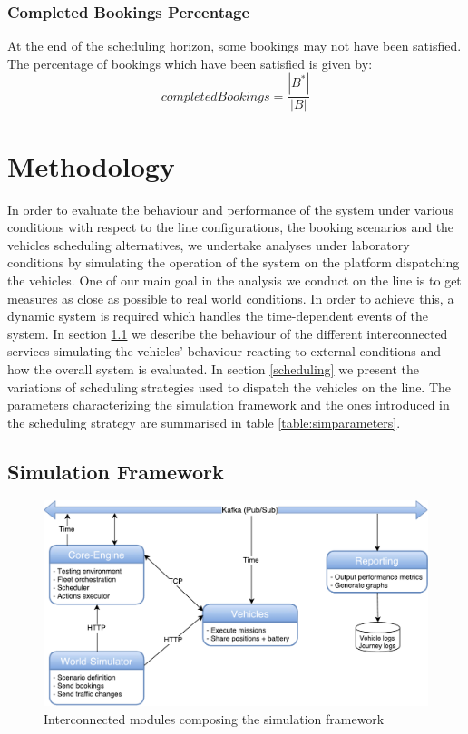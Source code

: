 \documentclass[12pt,a4paper]{article}
\begin{document}
\subsubsection*{Completed Bookings Percentage}
At the end of the scheduling horizon, some bookings may not have been satisfied. The percentage of bookings which have been satisfied is given by:
$$completedBookings = \frac{|B^{*}|}{|B|}$$

\section{Methodology}
In order to evaluate the behaviour and performance of the system under various conditions with respect to the line configurations, the booking scenarios and the vehicles scheduling alternatives, we undertake analyses under laboratory conditions by simulating the operation of the system on the platform dispatching the vehicles. One of our main goal in the analysis we conduct on the line is to get measures as close as possible to real world conditions. In order to achieve this, a dynamic system is required which handles the time-dependent events of the system. In section \ref{framework} we describe the behaviour of the different interconnected services simulating the vehicles' behaviour reacting to external conditions and how the overall system is evaluated. In section \ref{scheduling} we present the variations of scheduling strategies used to dispatch the vehicles on the line. The parameters characterizing the simulation framework and the ones introduced in the scheduling strategy are summarised in table \ref{table:simparameters}. 

\subsection{Simulation Framework}\label{framework}
\setlength{\belowcaptionskip}{10pt}
\begin{figure}[h] 
  \centering
\includegraphics[scale=0.55]{./images/SimulationFramework2.pdf}
\caption{Interconnected modules composing the simulation framework}
\label{fig:simulationFramework}
\end{figure}
\end{document}
